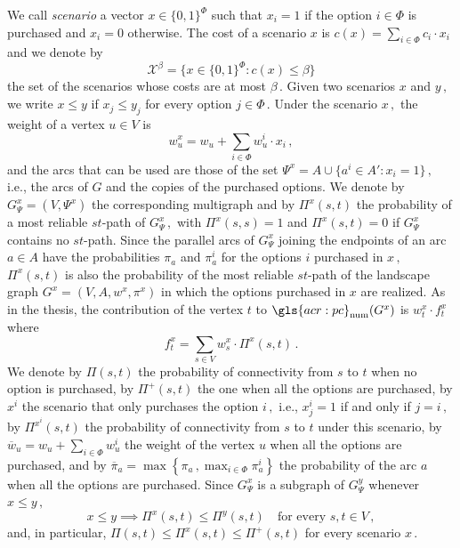 \documentclass[11pt,a4paper]{report}
\theoremstyle{definition}
\theoremstyle{remark}
\begin{document}
We call \textit{scenario} a vector $x \in \{0,1\}^\Phi$ such that $x_i = 1$ if the option $i \in \Phi$ is purchased and $x_i = 0$ otherwise. The cost of a scenario $x$ is $c(x) = \sum_{i \in \Phi} c_i \cdot x_i$ and we denote by
\begin{equation}
  \mathcal{X}^\beta = \{x \in \{0,1\}^\Phi : c(x) \leq \beta\}
\end{equation}
the set of the scenarios whose costs are at most $\beta\,.$ Given two scenarios $x$ and $y\,,$ we write $x \leq y$ if $x_j \leq y_j$ for every option $j \in \Phi\,.$ Under the scenario $x\,,$ the weight of a vertex $u \in V$ is
\begin{equation}
  w^x_u = w_u + \sum_{i \in \Phi} w^i_u \cdot x_i\,,
\end{equation}
and the arcs that can be used are those of the set $\Psi^x = A \cup \{a^i \in A' : x_i = 1\}\,,$ i.e., the arcs of $G$ and the copies of the purchased options. We denote by $G^x_\Psi = (V, \Psi^x)$ the corresponding multigraph and by $\Pi^x(s,t)$ the probability of a most reliable $st$-path of $G^x_\Psi\,,$ with $\Pi^x(s,s) = 1$ and $\Pi^x(s,t) = 0$ if $G^x_\Psi$ contains no $st$-path. Since the parallel arcs of $G^x_\Psi$ joining the endpoints of an arc $a \in A$ have the probabilities $\pi_a$ and $\pi^i_a$ for the options $i$ purchased in $x\,,$ $\Pi^x(s,t)$ is also the probability of the most reliable $st$-path of the landscape graph $G^x = (V,A,w^x,\pi^x)$ in which the options purchased in $x$ are realized. As in the thesis, the contribution of the vertex $t$ to $\gls{acr:pc}_{\text{num}}(G^x)$ is $w^x_t \cdot f^x_t$ where
\begin{equation}
  f^x_t = \sum_{s \in V} w^x_s \cdot \Pi^x(s,t)\,.
\end{equation}
We denote by $\Pi(s,t)$ the probability of connectivity from $s$ to $t$ when no option is purchased, by $\Pi^+(s,t)$ the one when all the options are purchased, by $x^i$ the scenario that only purchases the option $i\,,$ i.e., $x^i_j = 1$ if and only if $j = i\,,$ by $\Pi^{x^i}(s,t)$ the probability of connectivity from $s$ to $t$ under this scenario, by $\overline{w}_u = w_u + \sum_{i \in \Phi} w^i_u$ the weight of the vertex $u$ when all the options are purchased, and by $\overline{\pi}_a = \max\left\{\pi_a\,, \max_{i \in \Phi} \pi^i_a\right\}$ the probability of the arc $a$ when all the options are purchased. Since $G^x_\Psi$ is a subgraph of $G^y_\Psi$ whenever $x \leq y\,,$
\begin{equation}\label{eq:big_m_monotone}
  x \leq y \implies \Pi^x(s,t) \leq \Pi^y(s,t) \quad \text{for every $s,t \in V$}\,,
\end{equation}
and, in particular, $\Pi(s,t) \leq \Pi^x(s,t) \leq \Pi^+(s,t)$ for every scenario $x\,.$
\end{document}
